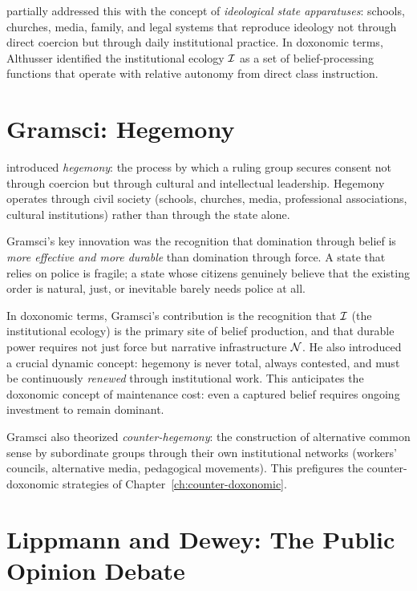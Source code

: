 \textcite{althusser1970} partially addressed this with the concept of \emph{ideological state apparatuses}: schools, churches, media, family, and legal systems that reproduce ideology not through direct coercion but through daily institutional practice.
In doxonomic terms, Althusser identified the institutional ecology $\mathcal{I}$ as a set of belief-processing functions that operate with relative autonomy from direct class instruction.


\section{Gramsci: Hegemony}
\label{sec:ch3-gramsci}

\textcite{gramsci1971} introduced \emph{hegemony}: the process by which a ruling group secures consent not through coercion but through cultural and intellectual leadership.
Hegemony operates through civil society (schools, churches, media, professional associations, cultural institutions) rather than through the state alone.

Gramsci's key innovation was the recognition that domination through belief is \emph{more effective and more durable} than domination through force.
A state that relies on police is fragile; a state whose citizens genuinely believe that the existing order is natural, just, or inevitable barely needs police at all.

In doxonomic terms, Gramsci's contribution is the recognition that $\mathcal{I}$ (the institutional ecology) is the primary site of belief production, and that durable power requires not just force but narrative infrastructure $\mathcal{N}$.
He also introduced a crucial dynamic concept: hegemony is never total, always contested, and must be continuously \emph{renewed} through institutional work.
This anticipates the doxonomic concept of maintenance cost: even a captured belief requires ongoing investment to remain dominant.

\begin{remark}
Gramsci also theorized \emph{counter-hegemony}: the construction of alternative common sense by subordinate groups through their own institutional networks (workers' councils, alternative media, pedagogical movements).
This prefigures the counter-doxonomic strategies of Chapter~\ref{ch:counter-doxonomic}.
\end{remark}


\section{Lippmann and Dewey: The Public Opinion Debate}
\label{sec:ch3-lippmann-dewey}

